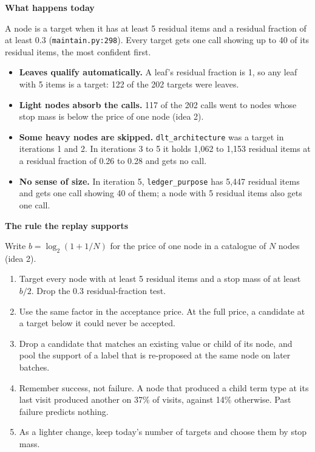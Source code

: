 \documentclass[10pt,a4paper]{article}
\newcommand{\code}[1]{\texttt{#1}}
\newcommand{\lab}[1]{\par\vspace{0.35em}\textbf{#1}\par\nobreak}
\begin{document}
\lab{What happens today}
A node is a target when it has at least 5 residual items and a residual fraction of at least 0.3
(\code{maintain.py:298}). Every target gets one call showing up to 40 of its residual items, the most
confident first.
\begin{itemize}
\item \textbf{Leaves qualify automatically.} A leaf's residual fraction is 1, so any leaf with 5 items is a target: 122 of the 202 targets were leaves.
\item \textbf{Light nodes absorb the calls.} 117 of the 202 calls went to nodes whose stop mass is below the price of one node (idea 2).
\item \textbf{Some heavy nodes are skipped.} \code{dlt\_architecture} was a target in iterations 1 and 2. In iterations 3 to 5 it holds 1,062 to 1,153 residual items at a residual fraction of 0.26 to 0.28 and gets no call.
\item \textbf{No sense of size.} In iteration 5, \code{ledger\_purpose} has 5,447 residual items and gets one call showing 40 of them; a node with 5 residual items also gets one call.
\end{itemize}

\lab{The rule the replay supports}
Write $b = \log_2(1 + 1/N)$ for the price of one node in a catalogue of $N$ nodes (idea 2).
\begin{enumerate}
\item Target every node with at least 5 residual items and a stop mass of at least $b/2$. Drop the 0.3 residual-fraction test.
\item Use the same factor in the acceptance price. At the full price, a candidate at a target below it could never be accepted.
\item Drop a candidate that matches an existing value or child of its node, and pool the support of a label that is re-proposed at the same node on later batches.
\item Remember success, not failure. A node that produced a child term type at its last visit produced another on 37\% of visits, against 14\% otherwise. Past failure predicts nothing.
\item As a lighter change, keep today's number of targets and choose them by stop mass.
\end{enumerate}
\end{document}
